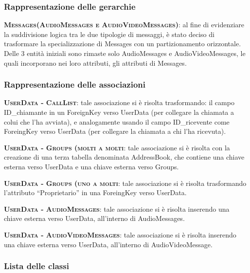 \subsubsection{Rappresentazione delle gerarchie}

\begin{description}
	\item{\scshape\bfseries Messages(AudioMessages e AudioVideoMessages)}: al fine di evidenziare la suddivisione logica tra le due tipologie di messaggi, è stato deciso di trasformare la specializzazione di Messages con un partizionamento orizzontale. Delle 3 entità iniziali sono rimaste solo AudioMessages e AudioVideoMessages, le quali incorporano nei loro attributi, gli attributi di Messages.
\end{description}

\subsubsection{Rappresentazione delle associazioni}

\begin{description}
	\item{\scshape\bfseries UserData - CallList}: tale associazione si è risolta trasformando: il campo ID\_chiamante in un ForeignKey verso UserData (per collegare la chiamata a colui che l'ha avviata), e analogamente usando il campo ID\_ricevente come ForeingKey verso UserData (per collegare la chiamata a chi l'ha ricevuta).
	\item{\scshape\bfseries UserData - Groups (molti a molti}: tale associazione si è risolta con la creazione di una terza tabella denominata AddressBook, che contiene una chiave esterna verso UserData e una chiave esterna verso Groups.
	\item{\scshape\bfseries UserData - Groups (uno a molti}: tale associazione si è risolta trasformando l'attributo ``Proprietario'' in una ForeingKey verso UserData.
	\item{\scshape\bfseries UserData - AudioMessages}: tale associazione si è risolta inserendo una chiave esterna verso UserData, all'interno di AudioMessages.
	\item{\scshape\bfseries UserData - AudioVideoMessages}: tale associazione si è risolta inserendo una chiave esterna verso UserData, all'interno di AudioVideoMessage.
\end{description}

\subsubsection{Lista delle classi}


